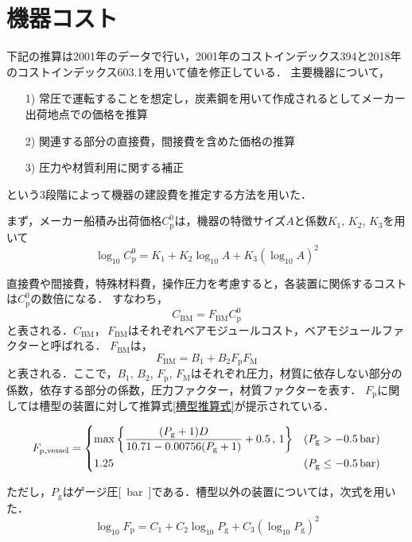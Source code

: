 \documentclass[a4j]{jsreport}
\begin{document}
\section{機器コスト}
下記の推算は2001年のデータで行い，2001年のコストインデックス394と2018年のコストインデックス603.1を用いて値を修正している\cite{講義資料3}．
主要機器について，
\begin{itemize}
    \item[1)]常圧で運転することを想定し，炭素鋼を用いて作成されるとしてメーカー出荷地点での価格を推算
    \item[2)]関連する部分の直接費，間接費を含めた価格の推算
    \item[3)]圧力や材質利用に関する補正
\end{itemize}
という3段階によって機器の建設費を推定する方法を用いた．

まず，メーカー船積み出荷価格$C_\mathrm{p}^0$は，機器の特徴サイズ$A$と係数$K_1, \, K_2, \, K_3$を用いて
\begin{equation}
    \log_{10}C_\mathrm{p}^0 = K_1 + K_2\log_{10} A + K_3(\log_{10} A)^2
\end{equation}

直接費や間接費，特殊材料費，操作圧力を考慮すると，各装置に関係するコストは$C_\mathrm{p}^0$の数倍になる．
すなわち，
\begin{equation}
    C_\mathrm{BM} = F_\mathrm{BM} C_\mathrm{p}^0
\end{equation}
と表される．$C_\mathrm{BM}， \, F_\mathrm{BM}$はそれぞれベアモジュールコスト，ベアモジュールファクターと呼ばれる．
$F_\mathrm{BM}$は，
\begin{equation}
    F_\mathrm{BM} = B_1 + B_2 F_\mathrm{p} F_\mathrm{M}
\end{equation}
と表される．ここで，$B_1, \, B_2, \, F_\mathrm{p}, \, F_\mathrm{M}$はそれぞれ圧力，材質に依存しない部分の係数，依存する部分の係数，圧力ファクター，材質ファクターを表す．
$F_\mathrm{p}$に関しては槽型の装置に対して推算式\eqref{槽型推算式}が提示されている．
\begin{center}
\begin{equation}
    F_\mathrm{p,vessel} =
        \begin{dcases}
            \max \left\{\dfrac{(P_\mathrm{g} + 1 )D}{10.71 - 0.00756(P_\mathrm{g} + 1)}+0.5 \, , \, 1 \right\} & (P_\mathrm{g} > -0.5\, \si{\bar}) \\
            1.25 & (P_\mathrm{g} \leq -0.5\, \si{\bar})
        \end{dcases}
    \label{槽型推算式}
\end{equation}
\end{center}
ただし，$P_\mathrm{g}$はゲージ圧\si{[\bar]}である．槽型以外の装置については，次式を用いた．
\begin{equation}
    \log_{10}F_\mathrm{p} = C_1 + C_2\log_{10} P_\mathrm{g} + C_3(\log_{10} P_\mathrm{g})^2
\end{equation}
\end{document}

